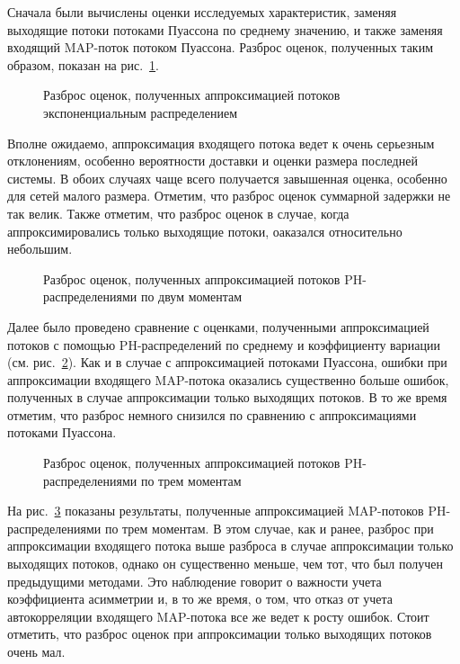Сначала были вычислены оценки исследуемых характеристик, заменяя выходящие потоки потоками Пуассона по среднему значению, и также заменяя входящий MAP-поток потоком Пуассона. Разброс оценок, полученных таким образом, показан на рис.~\ref{fig:ch4_scatter_ph1}.

\begin{figure}[h]
  \caption{Разброс оценок, полученных аппроксимацией потоков экспоненциальным распределением}
  \label{fig:ch4_scatter_ph1}
\end{figure}

Вполне ожидаемо, аппроксимация входящего потока ведет к очень серьезным отклонениям, особенно вероятности доставки и оценки размера последней системы. В обоих случаях чаще всего получается завышенная оценка, особенно для сетей малого размера. Отметим, что разброс оценок суммарной задержки не так велик. Также отметим, что разброс оценок в случае, когда аппроксимировались только выходящие потоки, оаказался относительно небольшим.

\begin{figure}[h]
  \caption{Разброс оценок, полученных аппроксимацией потоков PH-распределениями по двум моментам}
  \label{fig:ch4_scatter_ph2}
\end{figure}

Далее было проведено сравнение с оценками, полученными аппроксимацией потоков с помощью PH-распределений по среднему и коэффициенту вариации (см. рис.~\ref{fig:ch4_scatter_ph2}). Как и в случае с аппроксимацией потоками Пуассона, ошибки при аппроксимации входящего MAP-потока оказались существенно больше ошибок, полученных в случае аппроксимации только выходящих потоков. В то же время отметим, что разброс немного снизился по сравнению с аппроксимациями потоками Пуассона.

\begin{figure}[h]
  \caption{Разброс оценок, полученных аппроксимацией потоков PH-распределениями по трем моментам}
  \label{fig:ch4_scatter_ph3}
\end{figure}

На рис.~\ref{fig:ch4_scatter_ph3} показаны результаты, полученные аппроксимацией MAP-потоков PH-распределениями по трем моментам. В этом случае, как и ранее, разброс при аппроксимации входящего потока выше разброса в случае аппроксимации только выходящих потоков, однако он существенно меньше, чем тот, что был получен предыдущими методами. Это наблюдение говорит о важности учета коэффициента асимметрии и, в то же время, о том, что отказ от учета автокорреляции входящего MAP-потока все же ведет к росту ошибок. Стоит отметить, что разброс оценок при аппроксимации только выходящих потоков очень мал.


